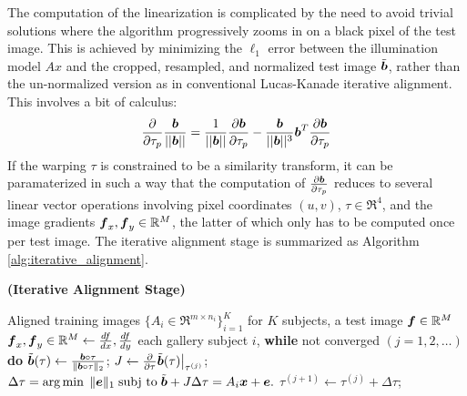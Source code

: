 \documentclass[10pt,twocolumn,letterpaper]{article}
\begin{document}
The computation of the linearization is complicated by the need to avoid trivial 
solutions where the algorithm
progressively zooms in on a black pixel of the test image.
This is achieved by minimizing the $\ell_1$ error between the illumination model $Ax$ and the cropped,
resampled, and normalized test image $\tilde{{\boldsymbol{b}}}$, rather than the un-normalized version as in 
conventional Lucas-Kanade iterative alignment.
This involves a bit of calculus:
\begin{equation}
\frac{\partial}{\partial \tau_p} \frac{{\boldsymbol{b}}}{||{\boldsymbol{b}}||} 
= \frac{1}{||{\boldsymbol{b}}||} \frac{\partial {\boldsymbol{b}}}{\partial \tau_p} - 
\frac{{\boldsymbol{b}}}{||{\boldsymbol{b}}||^3} {\boldsymbol{b}}^T \frac{\partial {\boldsymbol{b}}}{\partial \tau_p}
\end{equation}
If the warping $\tau$ is constrained to be a similarity transform,
it can be paramaterized in such a way that the computation of $\frac{\partial {\boldsymbol{b}}}{\partial \tau_p}$
reduces to several linear vector operations involving pixel coordinates $(u,v)$, $\tau \in \Re^4$,
and the image gradients $\boldsymbol{f}_x, \boldsymbol{f}_y \in {\mathbb{R}}^M$, the latter of which only has to be computed
once per test image.  The iterative alignment stage is summarized as Algorithm \eqref{alg:iterative_alignment}.
\begin{algorithm}[thb]
\caption{\bf (Iterative Alignment Stage)} \label{alg:iterative_alignment}
\begin{algorithmic}[1]
\begin{small}
 Aligned training images $\{A_i \in \Re^{m\times n_i}\}_{i=1}^K$ for $K$ subjects,  a test image
$\boldsymbol{f}\in{\mathbb{R}}^M$ 
\STATE $\boldsymbol{f}_x, \boldsymbol{f}_y \in {\mathbb{R}}^M \leftarrow \frac{df}{dx}, \frac{df}{dy}$ 
 each gallery subject $i$, 
\STATE \hspace{3mm} {\bf while} not converged $(j=1,2,\ldots)$ {\bf do} 
\STATE \hspace{6mm} $\tilde {{\boldsymbol{b}}}(\tau) \leftarrow \frac{{\boldsymbol{b}} \circ \tau}{\|{\boldsymbol{b}} \circ \tau\|_2}$;
\STATE \hspace{6mm} $J \leftarrow  \frac{\partial}{\partial \tau} \tilde{{\boldsymbol{b}}}(\tau)  \bigr|_{\tau^{(j)}} $;
\STATE \hspace{6mm} $\Delta \tau =  \arg\min \; \| \boldsymbol{e} \|_1  \; \textup{subj to} \; \tilde {{\boldsymbol{b}}} + J \Delta \tau = A_i {\boldsymbol{x}} + \boldsymbol{e}.$ 
\STATE \hspace{6mm} $\tau^{(j+1)} \leftarrow \tau^{(j)} + \Delta
\tau$; 
\end{small}
\end{algorithmic}
\end{algorithm}
\end{document}

